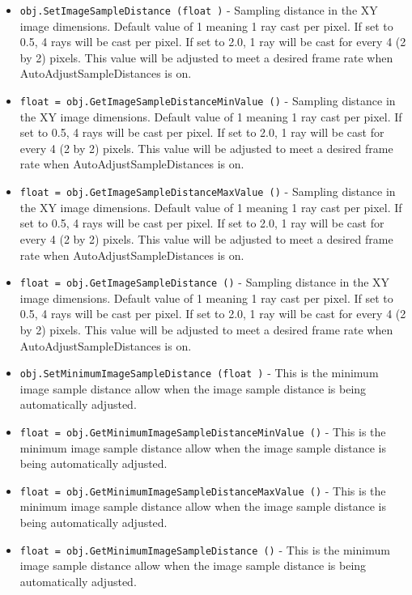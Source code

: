 \begin{itemize}
\item  \verb|obj.SetImageSampleDistance (float )| -  Sampling distance in the XY image dimensions. Default value of 1 meaning
 1 ray cast per pixel. If set to 0.5, 4 rays will be cast per pixel. If
 set to 2.0, 1 ray will be cast for every 4 (2 by 2) pixels. This value
 will be adjusted to meet a desired frame rate when AutoAdjustSampleDistances
 is on.

\item  \verb|float = obj.GetImageSampleDistanceMinValue ()| -  Sampling distance in the XY image dimensions. Default value of 1 meaning
 1 ray cast per pixel. If set to 0.5, 4 rays will be cast per pixel. If
 set to 2.0, 1 ray will be cast for every 4 (2 by 2) pixels. This value
 will be adjusted to meet a desired frame rate when AutoAdjustSampleDistances
 is on.

\item  \verb|float = obj.GetImageSampleDistanceMaxValue ()| -  Sampling distance in the XY image dimensions. Default value of 1 meaning
 1 ray cast per pixel. If set to 0.5, 4 rays will be cast per pixel. If
 set to 2.0, 1 ray will be cast for every 4 (2 by 2) pixels. This value
 will be adjusted to meet a desired frame rate when AutoAdjustSampleDistances
 is on.

\item  \verb|float = obj.GetImageSampleDistance ()| -  Sampling distance in the XY image dimensions. Default value of 1 meaning
 1 ray cast per pixel. If set to 0.5, 4 rays will be cast per pixel. If
 set to 2.0, 1 ray will be cast for every 4 (2 by 2) pixels. This value
 will be adjusted to meet a desired frame rate when AutoAdjustSampleDistances
 is on.

\item  \verb|obj.SetMinimumImageSampleDistance (float )| -  This is the minimum image sample distance allow when the image
 sample distance is being automatically adjusted.

\item  \verb|float = obj.GetMinimumImageSampleDistanceMinValue ()| -  This is the minimum image sample distance allow when the image
 sample distance is being automatically adjusted.

\item  \verb|float = obj.GetMinimumImageSampleDistanceMaxValue ()| -  This is the minimum image sample distance allow when the image
 sample distance is being automatically adjusted.

\item  \verb|float = obj.GetMinimumImageSampleDistance ()| -  This is the minimum image sample distance allow when the image
 sample distance is being automatically adjusted.


\end{itemize}
